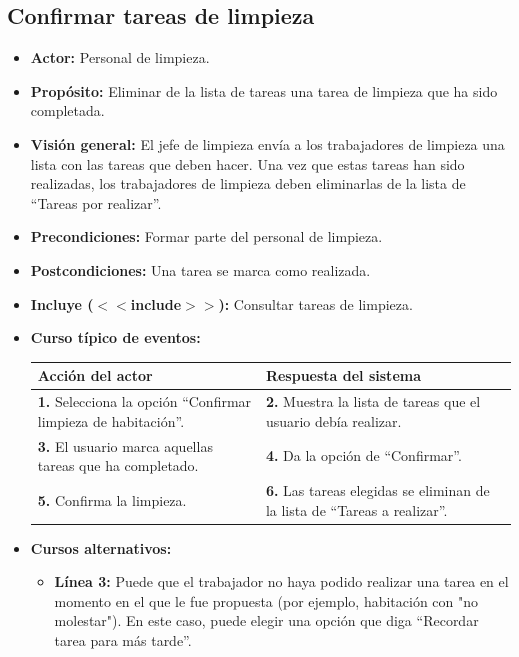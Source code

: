 \documentclass[spanish,a4paper,11pt, twoside]{report}	%
\begin{document}
		\subsection{Confirmar tareas de limpieza}
			\begin{itemize}
			\item \textbf{Actor:} Personal de limpieza.
			\item \textbf{Propósito: }Eliminar de la lista de tareas una tarea de limpieza que ha sido completada.
			\item \textbf{Visión general: }El jefe de limpieza envía a los trabajadores de
				limpieza una lista con las tareas que deben hacer. Una vez que estas tareas han
				sido realizadas, los trabajadores de limpieza deben eliminarlas de la lista de
				``Tareas por realizar''.
			\item \textbf{Precondiciones:} Formar parte del personal de limpieza.
			\item \textbf{Postcondiciones:} Una tarea se marca como realizada.
			\item \textbf{Incluye ($<<$include$>>$):} Consultar tareas de limpieza.%
			\item \textbf{Curso típico de eventos:}\\ 
				\begin{tabular}{|p{6cm}||p{6cm}|}
					\hline
					\textbf{Acción del actor} & \textbf{Respuesta del sistema} \\ \hline \hline
					\textbf{1.} Selecciona la opción  ``Confirmar limpieza de habitación''. & 
					\textbf{2.} Muestra la lista de tareas que el usuario debía realizar.\\ \hline 
					\textbf{3.} El usuario marca aquellas tareas que ha completado. & 
					\textbf{4.} Da la opción de ``Confirmar''.\\ \hline
					\textbf{5.} Confirma la limpieza. & 
					\textbf{6.} Las tareas elegidas se eliminan de la lista de ``Tareas a realizar''. \\ \hline
									\end{tabular}
			\item \textbf{Cursos alternativos:} 
				\begin{itemize}
					\item \textbf{Línea 3:} Puede que el trabajador no haya podido realizar una
					tarea en el momento en el que le fue propuesta (por ejemplo, habitación con "no
					molestar").
					En este caso, puede elegir una opción que diga ``Recordar tarea para más tarde''.
				\end{itemize}
		\end {itemize}
\end{document}
